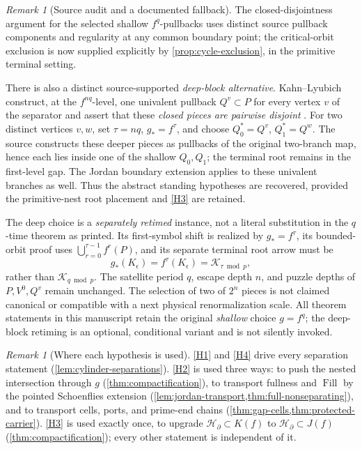 \documentclass[11pt,reqno]{amsart}
\numberwithin{equation}{section}
\theoremstyle{plain}
\theoremstyle{definition}
\theoremstyle{remark}
\newtheorem{remark}[theorem]{Remark}
\DeclareMathOperator{\Fill}{Fill}
\newcommand{\HB}{\mathcal H_\partial}
\newcommand{\Kcyc}{\mathcal K}
\newcommand{\rootK}{K_{\epsilon}}
\begin{document}
\begin{remark}[Source audit and a documented fallback]
\label{rem:fallback}
The closed-disjointness argument for the selected shallow $f^q$-pullbacks
uses distinct source pullback components and regularity at any common
boundary point; the critical-orbit exclusion is now supplied explicitly by
\cref{prop:cycle-exclusion}, in the primitive terminal setting.

There is also a distinct source-supported \emph{deep-block alternative}.
Kahn--Lyubich construct, at the $f^{nq}$-level, one univalent
pullback $Q^v\subset P$ for every vertex $v$ of the separator
and assert that these \emph{closed pieces are pairwise disjoint}
\cite[Lemma~2.1]{KLDecorations08}.  For two distinct vertices $v,w$,
set $\tau=nq$, $g_*=f^\tau$, and choose $Q^*_0=Q^v$,
$Q^*_1=Q^w$.  The source constructs these deeper pieces as pullbacks
of the original two-branch map, hence each lies inside one of the
shallow $Q_0,Q_1$; the terminal root remains in the first-level gap.
The Jordan boundary extension applies to these univalent branches as
well.  Thus the abstract standing hypotheses are recovered, provided
the primitive-nest root placement and \ref{H3} are retained.

The deep choice is a \emph{separately retimed} instance, not a literal
substitution in the $q$-time theorem as printed.  Its first-symbol
shift is realized by $g_*=f^\tau$, its bounded-orbit proof uses
$\bigcup_{r=0}^{\tau-1} f^r(P)$, and its separate terminal root arrow
must be
\[
  g_*(\rootK)=f^\tau(\rootK)=\Kcyc_{\tau\bmod p},
\]
rather than $\Kcyc_{q\bmod p}$.  The satellite period $q$,
escape depth $n$, and puzzle depths of $P,V^0,Q^v$ remain unchanged.
The selection of two of $2^n$ pieces is not claimed canonical or
compatible with a next physical renormalization scale.  All theorem
statements in this manuscript retain the original \emph{shallow}
choice $g=f^q$; the deep-block retiming is an optional, conditional
variant and is not silently invoked.
\end{remark}

\begin{remark}[Where each hypothesis is used]
\label{rem:hypothesis-use}
\ref{H1} and \ref{H4} drive every separation statement
(\cref{lem:cylinder-separations}).  \ref{H2} is used three ways: to push
the nested intersection through $g$ (\cref{thm:compactification}), to
transport fullness and $\Fill$ by the pointed Schoenflies extension
(\cref{lem:jordan-transport,thm:full-nonseparating}), and to transport
cells, ports, and prime-end chains
(\cref{thm:gap-cells,thm:protected-carrier}).  \ref{H3} is used exactly
once, to upgrade $\HB\subset K(f)$ to $\HB\subset J(f)$
(\cref{thm:compactification}); every other statement is independent of
it.
\end{remark}
\end{document}
